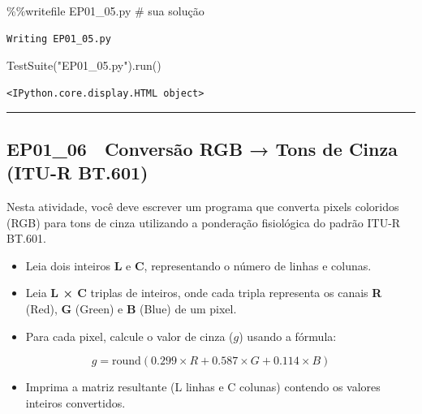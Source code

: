 \documentclass[
  portuguese,
  letterpaper,
  openany,
  oneside,
  12pt,
  a4paper]{book}
\newenvironment{Shaded}{\begin{snugshade}}{\end{snugshade}}
\newcommand{\CommentTok}[1]{\textcolor[rgb]{0.37,0.37,0.37}{#1}}
\newcommand{\NormalTok}[1]{\textcolor[rgb]{0.00,0.23,0.31}{#1}}
\newcommand{\OperatorTok}[1]{\textcolor[rgb]{0.37,0.37,0.37}{#1}}
\newcommand{\StringTok}[1]{\textcolor[rgb]{0.13,0.47,0.30}{#1}}
\providecommand{\tightlist}{%
  \setlength{\itemsep}{0pt}\setlength{\parskip}{0pt}}
\begin{document}
\begin{Shaded}
\begin{Highlighting}[]
\OperatorTok{\%\%}\NormalTok{writefile EP01\_05.py}
\CommentTok{\# sua solução}
\end{Highlighting}
\end{Shaded}

\begin{verbatim}
Writing EP01_05.py
\end{verbatim}

\begin{Shaded}
\begin{Highlighting}[]
\NormalTok{TestSuite(}\StringTok{"EP01\_05.py"}\NormalTok{).run()}
\end{Highlighting}
\end{Shaded}

\begin{verbatim}
<IPython.core.display.HTML object>
\end{verbatim}

\begin{center}\rule{0.5\linewidth}{0.5pt}\end{center}

\subsection{EP01\_06 🎨 Conversão RGB → Tons de Cinza (ITU-R
BT.601)}\label{ep01_06-conversuxe3o-rgb-tons-de-cinza-itu-r-bt.601}

Nesta atividade, você deve escrever um programa que converta pixels
coloridos (RGB) para tons de cinza utilizando a ponderação fisiológica
do padrão ITU-R BT.601.

\begin{itemize}
\tightlist
\item
  Leia dois inteiros \textbf{L} e \textbf{C}, representando o número de
  linhas e colunas.
\item
  Leia \textbf{L × C} triplas de inteiros, onde cada tripla representa
  os canais \textbf{R} (Red), \textbf{G} (Green) e \textbf{B} (Blue) de
  um pixel.
\item
  Para cada pixel, calcule o valor de cinza (\(g\)) usando a fórmula:
\end{itemize}

\[g = \text{round}(0.299 \times R + 0.587 \times G + 0.114 \times B)\]

\begin{itemize}
\tightlist
\item
  Imprima a matriz resultante (L linhas e C colunas) contendo os valores
  inteiros convertidos.
\end{itemize}
\end{document}
